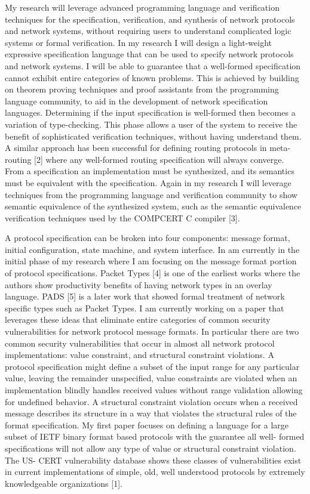 My research will leverage advanced programming language and verification
techniques for the specification, verification, and synthesis of network
protocols and network systems, without requiring users to understand complicated
logic systems or formal verification. In my research I will design a
light-weight expressive specification language that can be used to specify
network protocols and network systems. I will be able to guarantee that a
well-formed specification cannot exhibit entire categories of known problems.
This is achieved by building on theorem proving techniques and proof assistants
from the programming language community, to aid in the development of network
specification languages. Determining if the input specification is well-formed
then becomes a variation of type-checking. This phase allows a user of the
system to receive the benefit of sophisticated verification techniques, without
having understand them. A similar approach has been successful for defining
routing protocols in meta-routing [2] where any well-formed routing
specification will always converge. From a specification an implementation must
be synthesized, and its semantics must be equivalent with the specification.
Again in my research I will leverage techniques from the programming language
and verification community to show semantic equivalence of the synthesized 
system, such as the semantic equivalence verification techniques used by the
COMPCERT C compiler [3].

A protocol specification can be broken into four components: message format,
initial configuration, state machine, and system interface. In am currently in
the initial phase of my research where I am focusing on the message format
portion of protocol specifications. Packet Types [4] is one of the earliest
works where the authors show productivity benefits of having network types in an
overlay language. PADS [5] is a later work that showed formal treatment of
network specific types such as Packet Types. I am currently working on a paper
that leverages these ideas that eliminate entire categories of common security
vulnerabilities for network protocol message formats. In particular there are
two common security vulnerabilities that occur in almost all network protocol
implementations: value constraint, and structural constraint violations. A
protocol specification might define a subset of the input range for any
particular value, leaving the remainder unspecified, value constraints are
violated when an implementation blindly handles received values without range
validation allowing for undefined behavior. A structural constraint violation
occurs when a received message describes its structure in a way that violates
the structural rules of the format specification. My first paper focuses on
defining a language for a large subset of IETF binary format based protocols
with the guarantee all well- formed specifications will not allow any type of
value or structural constraint violation. The US- CERT vulnerability database
shows these classes of vulnerabilities exist in current implementations of
simple, old, well understood protocols by extremely knowledgeable organizations [1].
